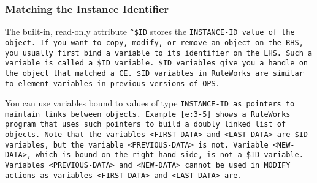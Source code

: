 \subsubsection{Matching the Instance Identifier}

The built-in, read-only attribute
\verb|^$ID| stores the \tt{INSTANCE-ID} value of the object. If you
want to copy, modify, or remove an object on the RHS, you usually
first bind a variable to its identifier on the LHS. Such a variable is
called a \verb|$ID| variable.
\verb|$ID| variables give you a handle on the object that matched a
CE. \verb|$ID| variables in RuleWorks are similar to element variables
in previous versions of OPS.

You can use variables bound to values of type \tt{INSTANCE-ID} as
pointers to maintain links between objects. Example~\ref{e:3-5} shows a
RuleWorks program that uses such pointers to build a doubly linked
list of objects. Note that the variables \verb|<FIRST-DATA>| and
\verb|<LAST-DATA>| are
\verb|$ID| variables, but the variable \verb|<PREVIOUS-DATA>| is
not. Variable \verb|<NEW-DATA>|, which is bound on the right-hand
side, is not a \verb|$ID| variable. Variables \verb|<PREVIOUS-DATA>|
and \verb|<NEW-DATA>| cannot be used in \tt{MODIFY} actions as
variables \verb|<FIRST-DATA>| and \verb|<LAST-DATA>| are.

